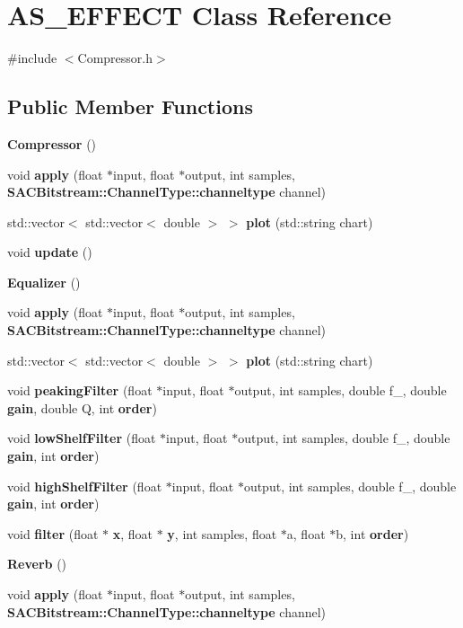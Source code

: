 \section{A\+S\+\_\+\+E\+F\+F\+E\+CT Class Reference}
\label{class_a_s___e_f_f_e_c_t}


{\ttfamily \#include $<$Compressor.\+h$>$}

\subsection*{Public Member Functions}
\begin{DoxyCompactItemize}
\item 
\textbf{ Compressor} ()
\item 
void \textbf{ apply} (float $\ast$input, float $\ast$output, int samples, \textbf{ S\+A\+C\+Bitstream\+::\+Channel\+Type\+::channeltype} channel)
\item 
std\+::vector$<$ std\+::vector$<$ double $>$ $>$ \textbf{ plot} (std\+::string chart)
\item 
void \textbf{ update} ()
\item 
\textbf{ Equalizer} ()
\item 
void \textbf{ apply} (float $\ast$input, float $\ast$output, int samples, \textbf{ S\+A\+C\+Bitstream\+::\+Channel\+Type\+::channeltype} channel)
\item 
std\+::vector$<$ std\+::vector$<$ double $>$ $>$ \textbf{ plot} (std\+::string chart)
\item 
void \textbf{ peaking\+Filter} (float $\ast$input, float $\ast$output, int samples, double f\+\_, double \textbf{ gain}, double Q, int \textbf{ order})
\item 
void \textbf{ low\+Shelf\+Filter} (float $\ast$input, float $\ast$output, int samples, double f\+\_, double \textbf{ gain}, int \textbf{ order})
\item 
void \textbf{ high\+Shelf\+Filter} (float $\ast$input, float $\ast$output, int samples, double f\+\_, double \textbf{ gain}, int \textbf{ order})
\item 
void \textbf{ filter} (float $\ast$\textbf{ x}, float $\ast$\textbf{ y}, int samples, float $\ast$a, float $\ast$b, int \textbf{ order})
\item 
\textbf{ Reverb} ()
\item 
void \textbf{ apply} (float $\ast$input, float $\ast$output, int samples, \textbf{ S\+A\+C\+Bitstream\+::\+Channel\+Type\+::channeltype} channel)

\end{DoxyCompactItemize}
